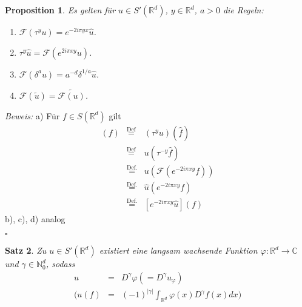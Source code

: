 \documentclass[12pt,a4paper,titlepage]{scrartcl}
\newtheorem{Satz}{Satz}[subsection]
\newtheorem{Prop}[Satz]{Proposition}
\numberwithin{equation}{section}
\newcommand{\C}{\mathbb{C}} %
\newcommand{\R}{\mathbb{R}} %
\newcommand{\N}{\mathbb{N}} %
\newcommand{\f}{\hat{f}}
\newcommand{\F}{\mathcal{F}}
\newcommand{\Bew}{\emph{Beweis: }}
\newcommand{\qed}{\begin{flushright}
		$\square$
	\end{flushright}}
\begin{document}
	\begin{Prop}
		Es gelten für $u\in S'(\R^d)$, $y\in \R^d$, $a>0$ die Regeln:
		\begin{enumerate}
			\item[a)] $\F(\tau^y u) = e^{-2i\pi y x} \hat{u}$.
			\item[b)] $\tau^y \hat u =\F(e^{2i\pi x y} u)$.
			\item[c)] $\F(\delta^a u) = a^{-d}\delta^{1/a} \hat u$.
			\item[d)] $\F(\tilde{u}) = \widetilde{\F(u)}$.
		\end{enumerate}
	\end{Prop}
	
	\Bew a) Für $f\in S(\R^d)$ gilt
	\begin{eqnarray}
		[F(\tau^y u)](f) &\overset{\text{Def}}{=}& (\tau^y u)(\f)\nonumber\\
		&\overset{\text{Def}}{=}& u(\tau^{-y}\f)\nonumber\\
		&\overset{\text{Def.}}{=}& u(\F(e^{-2i\pi xy}f))\nonumber\\
		&\overset{\text{Def.}}{=}& \hat u (e^{-2i\pi xy}f)\nonumber\\
		&\overset{\text{Def.}}{=}& [e^{-2i\pi xy}\hat u](f)\nonumber
	\end{eqnarray}
	b), c), d) analog
	\qed
	
	\begin{Satz}
		Zu $u\in S'(\R^d)$ existiert eine langsam wachsende Funktion $\varphi:\R^d\rightarrow \C$ und $\gamma\in \N_0^d$, sodass
		\begin{eqnarray}
			u &=& D^\gamma\varphi (= D^\gamma u_\varphi)\nonumber\\
			( u(f) &=& (-1)^{|\gamma|}\int_{\R^d}\varphi(x) D^{\gamma} f(x)dx ) \nonumber
		\end{eqnarray}
	\end{Satz}
	
\end{document}
